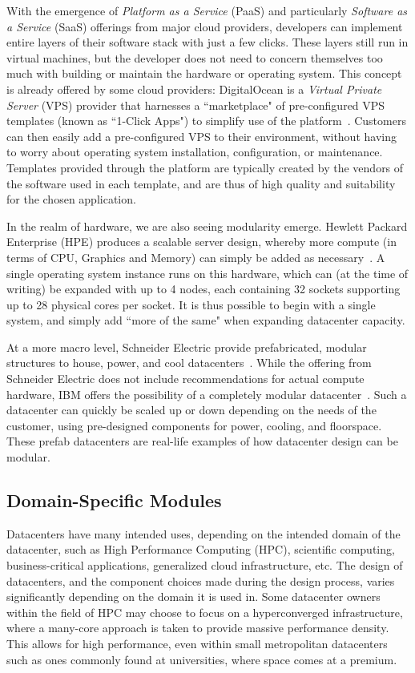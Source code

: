 \documentclass[11pt]{article}
\begin{document}
		With the emergence of \textit{Platform as a Service} (PaaS) and particularly \textit{Software as a Service} (SaaS) offerings from major cloud providers, developers can implement entire layers of their software stack with just a few clicks. 
		These layers still run in virtual machines, but the developer does not need to concern themselves too much with building or maintain the hardware or operating system.
		This concept is already offered by some cloud providers: DigitalOcean is a \textit{Virtual Private Server} (VPS) provider that harnesses a ``marketplace" of pre-configured VPS templates (known as ``1-Click Apps") to simplify use of the platform~\cite{DigitalOcean2020}. 
		Customers can then easily add a pre-configured VPS to their environment, without having to worry about operating system installation, configuration, or maintenance. 
		Templates provided through the platform are typically created by the vendors of the software used in each template, and are thus of high quality and suitability for the chosen application.

		In the realm of hardware, we are also seeing modularity emerge. 
		Hewlett Packard Enterprise (HPE) produces a scalable server design, whereby more compute (in terms of CPU, Graphics and Memory) can simply be added as necessary~\cite{Bang2020}.
		A single operating system instance runs on this hardware, which can (at the time of writing) be expanded with up to 4 nodes, each containing 32 sockets supporting up to 28 physical cores per socket.
		It is thus possible to begin with a single system, and simply add ``more of the same" when expanding datacenter capacity.

		At a more macro level, Schneider Electric provide prefabricated, modular structures to house, power, and cool datacenters~\cite{Torell2014, Torell2017}.
		While the offering from Schneider Electric does not include recommendations for actual compute hardware, IBM offers the possibility of a completely modular datacenter~\cite{IBM2014}.
		Such a datacenter can quickly be scaled up or down depending on the needs of the customer, using pre-designed components for power, cooling, and floorspace. 
		These prefab datacenters are real-life examples of how datacenter design can be modular.
	
	\subsection{Domain-Specific Modules}
		Datacenters have many intended uses, depending on the intended domain of the datacenter, such as High Performance Computing (HPC), scientific computing, business-critical applications, generalized cloud infrastructure, etc.
		The design of datacenters, and the component choices made during the design process, varies significantly depending on the domain it is used in.
		Some datacenter owners within the field of HPC may choose to focus on a hyperconverged infrastructure, where a many-core approach is taken to provide massive performance density.
		This allows for high performance, even within small metropolitan datacenters such as ones commonly found at universities, where space comes at a premium.
\end{document}
